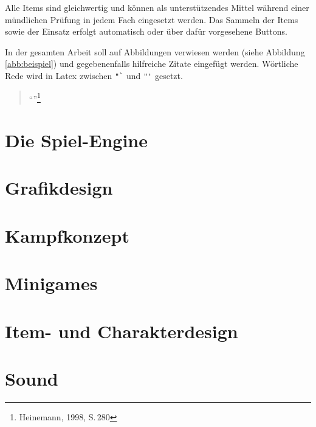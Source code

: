 Alle Items sind gleichwertig und können als unterstützendes Mittel während einer mündlichen Prüfung in jedem Fach eingesetzt werden. Das Sammeln der Items sowie der Einsatz erfolgt automatisch oder über dafür vorgesehene Buttons.


In der gesamten Arbeit soll auf Abbildungen verwiesen werden (siehe Abbildung \ref{abb:beispiel}) und gegebenenfalls hilfreiche Zitate eingefügt werden.\newline
Wörtliche Rede wird in Latex zwischen \verb|"`| und \verb|"'| gesetzt. 

\begin{quote}
 "`\blindtext"'\footnote{Heinemann, 1998, S.\,280}
\end{quote}

\section{Die Spiel-Engine}


\section{Grafikdesign}


\section{Kampfkonzept}


\section{Minigames}


\section{Item- und Charakterdesign}


\section{Sound}

